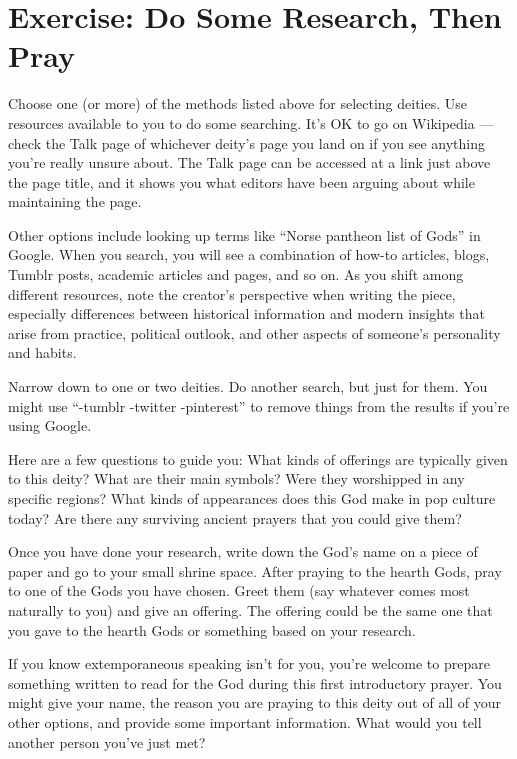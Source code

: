 \documentclass[
]{book}
\begin{document}
\hypertarget{exercise-do-some-research-then-pray}{%
\section{Exercise: Do Some Research, Then Pray}\label{exercise-do-some-research-then-pray}}

Choose one (or more) of the methods listed above for selecting deities. Use resources available to you to do some searching. It's OK to go on Wikipedia --- check the Talk page of whichever deity's page you land on if you see anything you're really unsure about. The Talk page can be accessed at a link just above the page title, and it shows you what editors have been arguing about while maintaining the page.

Other options include looking up terms like ``Norse pantheon list of Gods'' in Google. When you search, you will see a combination of how-to articles, blogs, Tumblr posts, academic articles and pages, and so on. As you shift among different resources, note the creator's perspective when writing the piece, especially differences between historical information and modern insights that arise from practice, political outlook, and other aspects of someone's personality and habits.

Narrow down to one or two deities. Do another search, but just for them. You might use ``-tumblr -twitter -pinterest'' to remove things from the results if you're using Google.

Here are a few questions to guide you: What kinds of offerings are typically given to this deity? What are their main symbols? Were they worshipped in any specific regions? What kinds of appearances does this God make in pop culture today? Are there any surviving ancient prayers that you could give them?

Once you have done your research, write down the God's name on a piece of paper and go to your small shrine space. After praying to the hearth Gods, pray to one of the Gods you have chosen. Greet them (say whatever comes most naturally to you) and give an offering. The offering could be the same one that you gave to the hearth Gods or something based on your research.

If you know extemporaneous speaking isn't for you, you're welcome to prepare something written to read for the God during this first introductory prayer. You might give your name, the reason you are praying to this deity out of all of your other options, and provide some important information. What would you tell another person you've just met?
\end{document}
